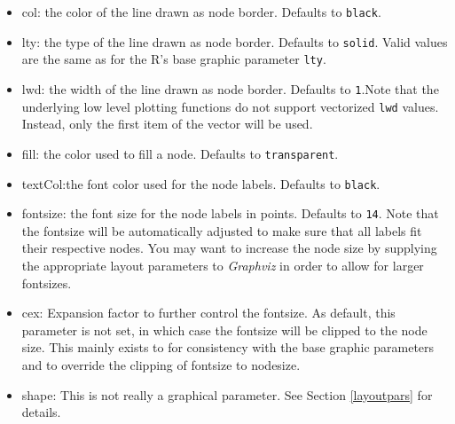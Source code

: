 \documentclass{article}
\newcommand{\Robject}[1]{{\texttt{#1}}}
\begin{document}
\begin{itemize}
\item{col:} {the color of the line drawn as node border. Defaults to
  \Robject{black}.}
\item{lty:} {the type of the line drawn as node border. Defaults to
  \Robject{solid}. Valid values are the same as for the R's base
  graphic parameter \Robject{lty}.}
\item{lwd:} {the width of the line drawn as node border. Defaults to
  \Robject{1}.Note that the underlying low level plotting functions
  do not support vectorized \Robject{lwd} values. Instead, only the
  first item of the vector will be used.}
\item{fill:} {the color used to fill a node. Defaults to
  \Robject{transparent}.}
\item{textCol:}{the font color used for the node labels. Defaults to
  \Robject{black}.}
\item{fontsize:} {the font size for the node labels in
  points. Defaults to \Robject{14}. Note that the fontsize will be
  automatically adjusted to make sure that all labels fit their
  respective nodes. You may want to increase the node size by
  supplying the appropriate layout parameters to \textit{Graphviz} in
  order to allow for larger fontsizes.}
\item{cex:} {Expansion factor to further control the fontsize. As
  default, this parameter is not set, in which case the fontsize will
  be clipped to the node size. This mainly exists to for consistency
  with the base graphic parameters and to override the clipping of
  fontsize to nodesize.}
\item{shape:} {This is not really a graphical parameter. See Section
    \ref{layoutpars} for details.}

\end{itemize}
\end{document}
